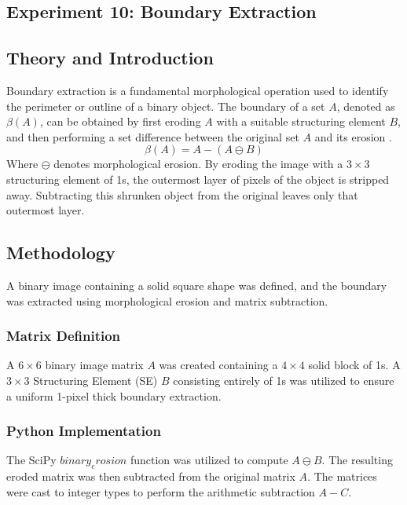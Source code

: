 \documentclass[11pt]{article}
\begin{document}
\captionsetup{justification=centering}


\pagebreak

\tableofcontents
\pagebreak
{}

\begin{center}
    \section{Experiment 10: Boundary Extraction}
\end{center}

\subsection{Theory and Introduction}
Boundary extraction is a fundamental morphological operation used to identify the perimeter or outline of a binary object. The boundary of a set $A$, denoted as $\beta(A)$, can be obtained by first eroding $A$ with a suitable structuring element $B$, and then performing a set difference between the original set $A$ and its erosion \cite{gonzalez2018}.
$$
    \beta(A) = A - (A \ominus B)
$$
Where $\ominus$ denotes morphological erosion. By eroding the image with a $3 \times 3$ structuring element of 1s, the outermost layer of pixels of the object is stripped away. Subtracting this shrunken object from the original leaves only that outermost layer.

\subsection{Methodology}
A binary image containing a solid square shape was defined, and the boundary was extracted using morphological erosion and matrix subtraction.

\subsubsection{Matrix Definition}
A $6 \times 6$ binary image matrix $A$ was created containing a $4 \times 4$ solid block of 1s. A $3 \times 3$ Structuring Element (SE) $B$ consisting entirely of 1s was utilized to ensure a uniform 1-pixel thick boundary extraction.

\subsubsection{Python Implementation}
The SciPy $binary_erosion$ function was utilized to compute $A \ominus B$. The resulting eroded matrix was then subtracted from the original matrix $A$. The matrices were cast to integer types to perform the arithmetic subtraction $A - C$.
\end{document}
